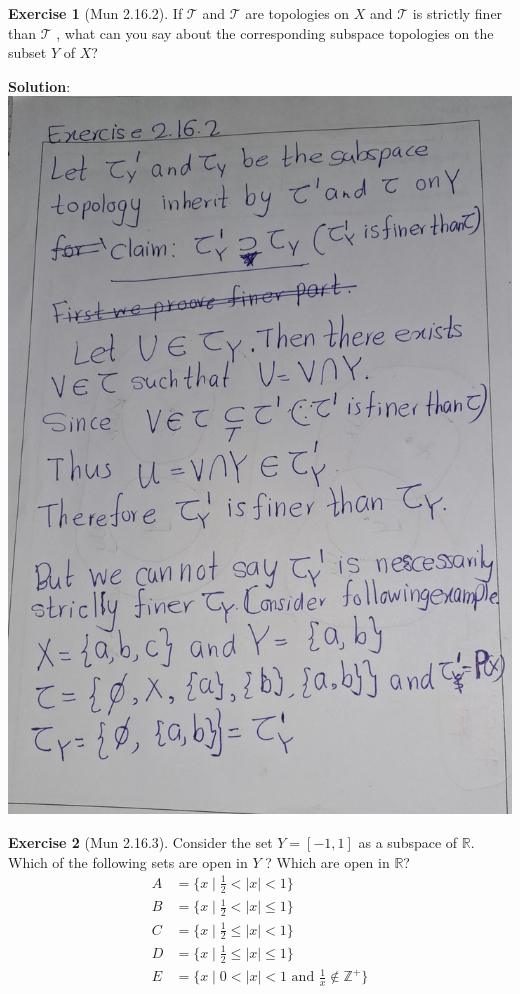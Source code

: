 \documentclass[
]{book}
\theoremstyle{definition}
\theoremstyle{definition}
\theoremstyle{definition}
\newtheorem{exercise}{Exercise}[chapter]
\theoremstyle{definition}
\theoremstyle{remark}
\begin{document}
\begin{exercise}[Mun 2.16.2]
\protect\hypertarget{exr:unnamed-chunk-120}{}\label{exr:unnamed-chunk-120}If \(\mathcal{T}\) and \(\mathcal{T}\) are topologies on \(X\) and \(\mathcal{T}\) is strictly finer than \(\mathcal{T}\) , what can you
say about the corresponding subspace topologies on the subset \(Y\) of \(X\)?
\end{exercise}

\textbf{Solution}:
\includegraphics{figures/Exercises/Ex 2.16/ex-2.jpg}

\begin{exercise}[Mun 2.16.3]
\protect\hypertarget{exr:unnamed-chunk-122}{}\label{exr:unnamed-chunk-122}Consider the set \(Y = [−1, 1]\) as a subspace of \(\mathbb{R}\). Which of the following sets are open in \(Y\) ? Which are open in \(\mathbb{R}\)?
\begin{align}
A &= \{ x \mid \frac{1}{2} < |x| < 1 \}\\ 
B &= \{ x \mid \frac{1}{2} < |x| \leq 1 \} \\
C &= \{ x \mid \frac{1}{2} \leq |x| < 1 \}\\
D &= \{ x \mid \frac{1}{2} \leq |x| \leq 1 \}\\
E &= \{ x \mid 0 < |x| < 1 \text{ and } \frac{1}{x} \notin \mathbb{Z}^+ \}
\end{align}
\end{exercise}
\end{document}
